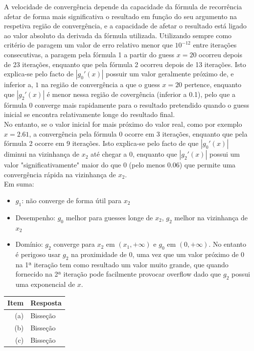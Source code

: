 {A velocidade de convergência depende da capacidade da fórmula de recorrência afetar de forma mais significativa o resultado em função do seu argumento na respetiva região de convergência, e a capacidade de afetar o resultado está ligado ao valor absoluto da derivada da fórmula utilizada.
Utilizando sempre como critério de paragem um valor de erro relativo menor que $10^{-12}$ entre iterações consecutivas, a paragem pela fórmula 1 a partir do guess $x=20$ ocorreu depois de 23 iterações, enquanto que pela fórmula 2 ocorreu depois de 13 iterações. Isto explica-se pelo facto de $|g_0'(x)|$ possuir um valor geralmente próximo de, e inferior a, $1$ na região de convergência a que o guess $x=20$ pertence, enquanto que $|g_2'(x)|$ é menor nessa região de covergência (inferior a 0.1), pelo que a fórmula 0 converge mais rapidamente para o resultado pretendido quando o guess inicial se encontra relativamente longe do resultado final.\\
No entanto, se o valor inicial for mais próximo do valor real, como por exemplo $x=2.61$, a convergência pela fórmula 0 ocorre em 3 iterações, enquanto que pela fórmula 2 ocorre em 9 iterações. Isto explica-se pelo facto de que $|g_0'(x)|$ diminui na vizinhança de $x_2$ até chegar a $0$, enquanto que $|g_2'(x)|$ possui um valor "significativamente" maior do que $0$ (pelo menos 0.06) que permite uma convergência rápida na vizinhança de $x_2$.\\
Em suma:
\begin{itemize}
	\item $g_1$: não converge de forma útil para $x_2$
	\item Desempenho: $g_0$ melhor para guesses longe de $x_2$, $g_2$ melhor na vizinhança de $x_2$
	\item Domínio: $g_2$ converge para $x_2$ em $(x_1,+\infty)$ e $g_0$ em $(0,+\infty)$. No entanto é perigoso usar $g_2$ na proximidade de $0$, uma vez que um valor próximo de $0$ na 1ª iteração tem como resultado um valor muito grande, que quando fornecido na 2ª iteração pode facilmente provocar overflow dado que $g_2$ possui uma exponencial de $x$.
\end{itemize}
\begin{center} \begin{tabular}{r | l}
	\textbf{Item} & \textbf{Resposta} \\ \hline
	(a) & Bisseção \\
	(b) & Bisseção \\
	(c) & Bisseção \\

\end{tabular}
\end{center}}
